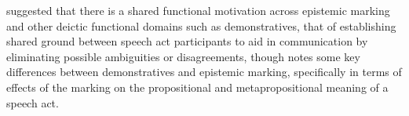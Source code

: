 suggested that there is a shared functional motivation across epistemic marking and other deictic functional domains such as demonstratives, that of establishing shared ground between speech act participants to aid in communication by eliminating possible ambiguities or disagreements, though notes some key differences between demonstratives and epistemic marking, specifically in terms of effects of the marking on the propositional and metapropositional meaning of a speech act.
